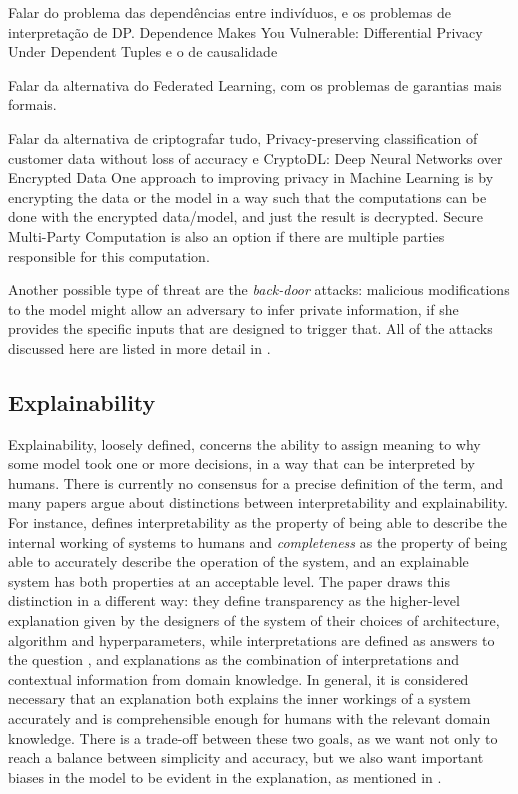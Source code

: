 {\color{red} Falar do problema das dependências entre indivíduos, e os problemas de interpretação de DP. Dependence Makes You Vulnerable: Differential Privacy Under Dependent Tuples e o de causalidade}

{\color{red} Falar da alternativa do Federated Learning, com os problemas de garantias mais formais.}

{\color{red} Falar da alternativa de criptografar tudo, Privacy-preserving classification of customer data without loss of accuracy e CryptoDL: Deep Neural Networks over Encrypted Data}
One approach to improving privacy in Machine Learning is by encrypting the data or the model in a way such that the computations can be done with the encrypted data/model, and just the result is decrypted. Secure Multi-Party Computation is also an option if there are multiple parties responsible for this computation.


Another possible type of threat are the \emph{back-door} attacks: malicious modifications to the model might allow an adversary to infer private information, if she provides the specific inputs that are designed to trigger that. All of the attacks discussed here are listed in more detail in \cite{liu2021machine}.


\subsection{Explainability}

Explainability, loosely defined, concerns the ability to assign meaning to why some model took one or more decisions, in a way that can be interpreted by humans. There is currently no consensus for a precise definition of the term, and many papers argue about distinctions between interpretability and explainability. For instance, \cite{gilpin2018explaining} defines interpretability as the property of being able to describe the internal working of systems to humans and \emph{completeness} as the property of being able to accurately describe the operation of the system, and an explainable system has both properties at an acceptable level. The paper \cite{roscher2020explainable} draws this distinction in a different way: they define transparency as the higher-level explanation given by the designers of the system of their choices of architecture, algorithm and hyperparameters, while interpretations are defined as answers to the question , and explanations as the combination of interpretations and contextual information from domain knowledge. In general, it is considered necessary that an explanation both explains the inner workings of a system accurately and is comprehensible enough for humans with the relevant domain knowledge. There is a trade-off between these two goals, as we want not only to reach a balance between simplicity and accuracy, but we also want important biases in the model to be evident in the explanation, as mentioned in \cite{gilpin2018explaining}.

